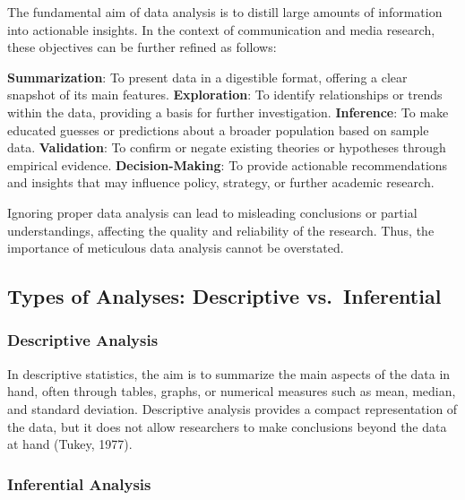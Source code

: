 \documentclass[
  b5paper]{book}
\begin{document}
The fundamental aim of data analysis is to distill large amounts of information into actionable insights. In the context of communication and media research, these objectives can be further refined as follows:

\textbf{Summarization}: To present data in a digestible format, offering a clear snapshot of its main features. \textbf{Exploration}: To identify relationships or trends within the data, providing a basis for further investigation. \textbf{Inference}: To make educated guesses or predictions about a broader population based on sample data. \textbf{Validation}: To confirm or negate existing theories or hypotheses through empirical evidence. \textbf{Decision-Making}: To provide actionable recommendations and insights that may influence policy, strategy, or further academic research.

Ignoring proper data analysis can lead to misleading conclusions or partial understandings, affecting the quality and reliability of the research. Thus, the importance of meticulous data analysis cannot be overstated.

\hypertarget{types-of-analyses-descriptive-vs.-inferential}{%
\subsection*{Types of Analyses: Descriptive vs.~Inferential}\label{types-of-analyses-descriptive-vs.-inferential}}

\hypertarget{descriptive-analysis}{%
\subsubsection*{Descriptive Analysis}\label{descriptive-analysis}}

In descriptive statistics, the aim is to summarize the main aspects of the data in hand, often through tables, graphs, or numerical measures such as mean, median, and standard deviation. Descriptive analysis provides a compact representation of the data, but it does not allow researchers to make conclusions beyond the data at hand (Tukey, 1977).

\hypertarget{inferential-analysis}{%
\subsubsection*{Inferential Analysis}\label{inferential-analysis}}
\end{document}
